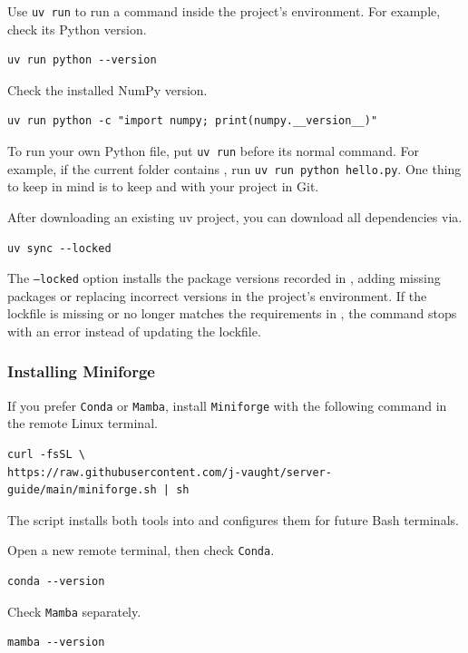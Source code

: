 \documentclass[12pt]{article}
\newcommand{\program}[1]{\begingroup\setlength{\fboxsep}{2pt}%
  \colorbox{ProgramBackground}{\texttt{#1}}\endgroup}
\newcommand{\inlinecode}[1]{\begingroup\setlength{\fboxsep}{2pt}%
  \colorbox{black!5}{\texttt{#1}}\endgroup}
\begin{document}
Use \inlinecode{uv run} to run a command inside the project's environment. For example, check its Python version.
\begin{lstlisting}
uv run python --version
\end{lstlisting}

Check the installed NumPy version.
\begin{lstlisting}
uv run python -c "import numpy; print(numpy.__version__)"
\end{lstlisting}

To run your own Python file, put \inlinecode{uv run} before its normal command. For example, if the current folder contains , run \inlinecode{uv run python hello.py}. One thing to keep in mind is to keep  and  with your project in Git. 

After downloading an existing uv project, you can download all dependencies via.
\begin{lstlisting}
uv sync --locked
\end{lstlisting}

The \inlinecode{--locked} option installs the package versions recorded in , adding missing packages or replacing incorrect versions in the project's environment. If the lockfile is missing or no longer matches the requirements in , the command stops with an error instead of updating the lockfile. 

\subsubsection*{Installing Miniforge}

If you prefer \program{Conda} or \program{Mamba}, install \program{Miniforge} with the following command in the remote Linux terminal.
\begin{lstlisting}
curl -fsSL \
https://raw.githubusercontent.com/j-vaught/server-guide/main/miniforge.sh | sh
\end{lstlisting}

The script installs both tools into  and configures them for future Bash terminals.

Open a new remote terminal, then check \program{Conda}.
\begin{lstlisting}
conda --version
\end{lstlisting}

Check \program{Mamba} separately.
\begin{lstlisting}
mamba --version
\end{lstlisting}
\end{document}
